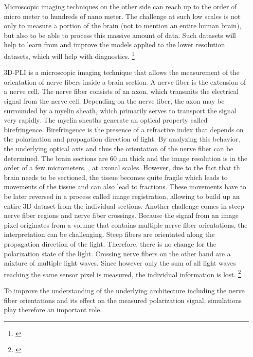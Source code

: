 Microscopic imaging techniques on the other side can reach up to the order of micro meter to hundreds of nano meter.
The challenge at such low scales is not only to measure a portion of the brain (not to mention an entire human brain), but also to be able to process this massive amount of data.
Such datasets will help to learn from and improve the models applied to the lower resolution datasets, which will help with \eg{} diagnostics.
\footnote{\cite{MaierHein2017, Schilling2021, Yendiki2021, Costantini2021}}
\par
% 
\ac{3D-PLI} is a microscopic imaging technique that allows the measurement of the orientation of nerve fibers inside a brain section.
A nerve fiber is the extension of a nerve cell.
The nerve fiber consists of an axon, which transmits the electrical signal from the nerve cell.
Depending on the nerve fiber, the axon may be surrounded by a myelin sheath, which primarily serves to transport the signal very rapidly.
The myelin sheaths generate an optical property called birefringence.
Birefringence is the presence of a refractive index that depends on the polarization and propagation direction of light.
By analyzing this behavior, the underlying optical axis and thus the orientation of the nerve fiber can be determined.
The brain sections are $\SI{60}{\micro\meter}$ thick and the image resolution is in the order of a few micrometers, \ie{}, at axonal scales.
However, due to the fact that th brain needs to be sectioned, the tissue becomes quite fragile which leads to movements of the tissue and can also lead to fractions.
These movements have to be later reversed in a process called image registration, allowing to build up an entire 3D dataset from the individual sections.
Another challenge comes in steep nerve fiber regions and nerve fiber crossings.
Because the signal from an image pixel originates from a volume that contains multiple nerve fiber orientations, the interpretation can be challenging.
Steep fibers are \eg{} orientated along the propagation direction of the light.
Therefore, there is no change for the polarization state of the light.
Crossing nerve fibers on the other hand are a mixture of multiple light waves.
Since however only the sum of all light waves reaching the same sensor pixel is measured, the individual information is lost.
\footnote{\cite{Axer2011a, Axer2011, Axer2016}}
\par
% 
To improve the understanding of the underlying architecture including the nerve fiber orientations and its effect on the measured polarization signal, simulations play therefore an important role.
